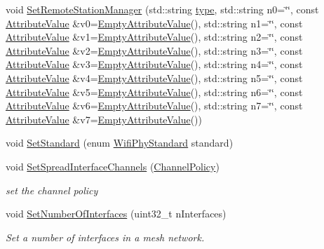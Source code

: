 \begin{DoxyCompactItemize}
void \hyperlink{classns3_1_1MeshHelper_a83c0533e877d5f850e16661584d920da}{Set\+Remote\+Station\+Manager} (std\+::string \hyperlink{visualizer-ideas_8txt_add98db9e15e2a58cf2b57623e7aa893a}{type}, std\+::string n0=\char`\"{}\char`\"{}, const \hyperlink{classns3_1_1AttributeValue}{Attribute\+Value} \&v0=\hyperlink{classns3_1_1EmptyAttributeValue}{Empty\+Attribute\+Value}(), std\+::string n1=\char`\"{}\char`\"{}, const \hyperlink{classns3_1_1AttributeValue}{Attribute\+Value} \&v1=\hyperlink{classns3_1_1EmptyAttributeValue}{Empty\+Attribute\+Value}(), std\+::string n2=\char`\"{}\char`\"{}, const \hyperlink{classns3_1_1AttributeValue}{Attribute\+Value} \&v2=\hyperlink{classns3_1_1EmptyAttributeValue}{Empty\+Attribute\+Value}(), std\+::string n3=\char`\"{}\char`\"{}, const \hyperlink{classns3_1_1AttributeValue}{Attribute\+Value} \&v3=\hyperlink{classns3_1_1EmptyAttributeValue}{Empty\+Attribute\+Value}(), std\+::string n4=\char`\"{}\char`\"{}, const \hyperlink{classns3_1_1AttributeValue}{Attribute\+Value} \&v4=\hyperlink{classns3_1_1EmptyAttributeValue}{Empty\+Attribute\+Value}(), std\+::string n5=\char`\"{}\char`\"{}, const \hyperlink{classns3_1_1AttributeValue}{Attribute\+Value} \&v5=\hyperlink{classns3_1_1EmptyAttributeValue}{Empty\+Attribute\+Value}(), std\+::string n6=\char`\"{}\char`\"{}, const \hyperlink{classns3_1_1AttributeValue}{Attribute\+Value} \&v6=\hyperlink{classns3_1_1EmptyAttributeValue}{Empty\+Attribute\+Value}(), std\+::string n7=\char`\"{}\char`\"{}, const \hyperlink{classns3_1_1AttributeValue}{Attribute\+Value} \&v7=\hyperlink{classns3_1_1EmptyAttributeValue}{Empty\+Attribute\+Value}())
\item 
void \hyperlink{classns3_1_1MeshHelper_a4724c5e5c2ae4e58662e56150ca3e1a3}{Set\+Standard} (enum \hyperlink{group__wifi_ga1299834f4e1c615af3ca738033b76a49}{Wifi\+Phy\+Standard} standard)
\item 
void \hyperlink{classns3_1_1MeshHelper_a7c3e41644f086e526c3f39f3448e41ce}{Set\+Spread\+Interface\+Channels} (\hyperlink{classns3_1_1MeshHelper_ac0e3f8f6ae16a79bb09cc25e5c7b8301}{Channel\+Policy})
\begin{DoxyCompactList}\small\item\em set the channel policy \end{DoxyCompactList}\item 
void \hyperlink{classns3_1_1MeshHelper_adfc08b62a8d6e835d0fbbac7a349ef5f}{Set\+Number\+Of\+Interfaces} (uint32\+\_\+t n\+Interfaces)
\begin{DoxyCompactList}\small\item\em Set a number of interfaces in a mesh network. \end{DoxyCompactList}\item 

\end{DoxyCompactItemize}
